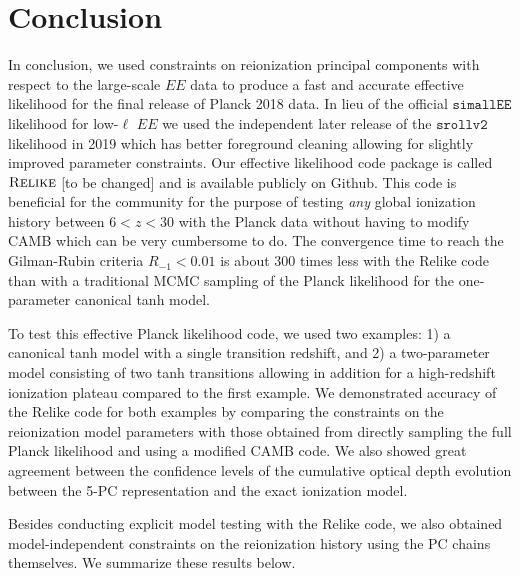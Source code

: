 \documentclass[prd,twocolumn,amsmath,amssymb,floatfix,superscriptaddress,nofootinbib]{revtex4-1}
\begin{document}
\section{Conclusion}
\label{sec:conclusion}

In conclusion, we used constraints on reionization principal components with respect to the large-scale $EE$ data to produce a fast and accurate effective likelihood for the final release of Planck 2018 data. In lieu of the official $\texttt{simallEE}$ likelihood for low-$\ell$ $EE$ we used the independent later release of the $\texttt{srollv2}$ likelihood in 2019 which has better foreground cleaning allowing for slightly improved parameter constraints. Our effective likelihood code package is called $\textsc{Relike}$ [to be changed] and is available publicly on Github. This code is beneficial for the community for the purpose of testing \textit{any} global ionization history between $6 < z < 30$ with the Planck data without having to modify CAMB which can be very cumbersome to do. The convergence time to reach the Gilman-Rubin criteria $R_{-1} < 0.01$ is about 300 times less with the Relike code than with a traditional MCMC sampling of the Planck likelihood for the one-parameter canonical tanh model. 

To test this effective Planck likelihood code, we used two examples: 1) a canonical tanh model with a single transition redshift, and 2) a two-parameter model consisting of two tanh transitions allowing in addition for a high-redshift ionization plateau compared to the first example. We demonstrated accuracy of the Relike code for both examples by comparing the constraints on the reionization model parameters with those obtained from directly sampling the full Planck likelihood and using a modified CAMB code. We also showed great agreement between the confidence levels of the cumulative optical depth evolution between the 5-PC representation and the exact ionization model.

Besides conducting explicit model testing with the Relike code, we also obtained model-independent constraints on the reionization history using the PC chains themselves. We summarize these results below.
\end{document}
